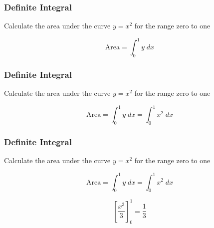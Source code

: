 \documentclass{beamer}
\begin{document}

\begin{frame}
\frametitle{Definite Integral}
\Large
\vspace{-1.5cm}
Calculate the area under the curve $y=x^2$ for the range zero to one

\[ \mbox{Area} =\int^1_0 y \;dx \]
\end{frame}
\begin{frame}
\frametitle{Definite Integral}
\Large
\vspace{-1.5cm}
Calculate the area under the curve $y=x^2$ for the range zero to one

\[ \mbox{Area} =\int^1_0 y\; dx = \int^1_0 x^2 \;dx  \]
\end{frame}
\begin{frame}
\frametitle{Definite Integral}
\Large
\vspace{-1.0cm}
Calculate the area under the curve $y=x^2$ for the range zero to one

\[ \mbox{Area} =\int^1_0 y\; dx = \int^1_0 x^2 \;dx  \]

\[  \left[ \frac{x^3}{3} \right]^1_0 = \frac{1}{3} \]
\end{frame}
\begin{frame}

\end{frame}
\end{document}
